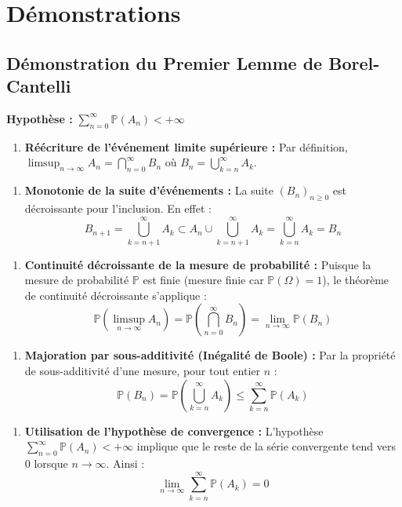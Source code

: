 \documentclass[11pt,a4paper]{article}
\begin{document}
\section{Démonstrations}

\subsection{Démonstration du Premier Lemme de Borel-Cantelli}

\textbf{Hypothèse :} $\sum_{n=0}^\infty \mathbb{P}(A_n) < +\infty$

\begin{enumerate}
\item \textbf{Réécriture de l'événement limite supérieure :}
   Par définition, $\limsup_{n \to \infty} A_n = \bigcap_{n=0}^\infty B_n$ où $B_n = \bigcup_{k=n}^\infty A_k$.
\end{enumerate}

\begin{enumerate}
\item \textbf{Monotonie de la suite d'événements :}
   La suite $(B_n)_{n \ge 0}$ est décroissante pour l'inclusion. En effet :
   $$ B_{n+1} = \bigcup_{k=n+1}^\infty A_k \subset A_n \cup \bigcup_{k=n+1}^\infty A_k = \bigcup_{k=n}^\infty A_k = B_n $$
\end{enumerate}

\begin{enumerate}
\item \textbf{Continuité décroissante de la mesure de probabilité :}
   Puisque la mesure de probabilité $\mathbb{P}$ est finie (mesure finie car $\mathbb{P}(\Omega) = 1$), le théorème de continuité décroissante s'applique :
   $$ \mathbb{P}\left( \limsup_{n \to \infty} A_n \right) = \mathbb{P}\left( \bigcap_{n=0}^\infty B_n \right) = \lim_{n \to \infty} \mathbb{P}(B_n) $$
\end{enumerate}

\begin{enumerate}
\item \textbf{Majoration par sous-additivité (Inégalité de Boole) :}
   Par la propriété de sous-additivité d'une mesure, pour tout entier $n$ :
   $$ \mathbb{P}(B_n) = \mathbb{P}\left( \bigcup_{k=n}^\infty A_k \right) \le \sum_{k=n}^\infty \mathbb{P}(A_k) $$
\end{enumerate}

\begin{enumerate}
\item \textbf{Utilisation de l'hypothèse de convergence :}
   L'hypothèse $\sum_{n=0}^\infty \mathbb{P}(A_n) < +\infty$ implique que le reste de la série convergente tend vers $0$ lorsque $n \to \infty$. Ainsi :
   $$ \lim_{n \to \infty} \sum_{k=n}^\infty \mathbb{P}(A_k) = 0 $$
\end{enumerate}
\end{document}
